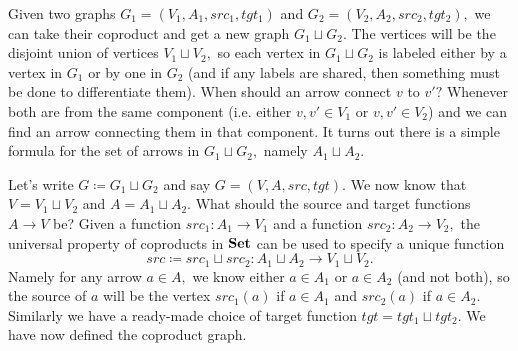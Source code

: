 \documentclass[../main/CT4S-EN-RU]{subfiles}
\begin{document}
\begin{exampleENG}\label{ex:coproduct of graphs}
Given two graphs $G_1=(V_1,A_1,src_1,tgt_1)$ and $G_2=(V_2,A_2,src_2,tgt_2),$ we can take their coproduct and get a new graph $G_1\sqcup G_2.$ The vertices will be the disjoint union of vertices $V_1\sqcup V_2,$ so each vertex in $G_1\sqcup G_2$ is labeled either by a vertex in $G_1$ or by one in $G_2$ (and if any labels are shared, then something must be done to differentiate them). When should an arrow connect $v$ to $v'?$ Whenever both are from the same component (i.e. either $v,v'\in V_1$ or $v,v'\in V_2$) and we can find an arrow connecting them in that component. It turns out there is a simple formula for the set of arrows in $G_1\sqcup G_2,$ namely $A_1\sqcup A_2.$

Let's write $G{\coloneqq}G_1\sqcup G_2$ and say $G=(V,A,src,tgt).$ We now know that $V=V_1\sqcup V_2$ and $A=A_1\sqcup A_2.$ What should the source and target functions $A{→} V$ be? Given a function $src_1\colon A_1{→} V_1$ and a function $src_2\colon A_2{→} V_2,$ the universal property of coproducts in ${\mathbf{Set}}$ can be used to specify a unique function 
$$src{\coloneqq}src_1\sqcup src_2\colon A_1\sqcup A_2{→} V_1\sqcup V_2.$$ 
Namely for any arrow $a\in A,$ we know either $a\in A_1$ or $a\in A_2$ (and not both), so the source of $a$ will be the vertex $src_1(a)$ if $a\in A_1$ and $src_2(a)$ if $a\in A_2.$ Similarly we have a ready-made choice of target function $tgt=tgt_1\sqcup tgt_2.$ We have now defined the coproduct graph.


\end{exampleENG}
\end{document}
